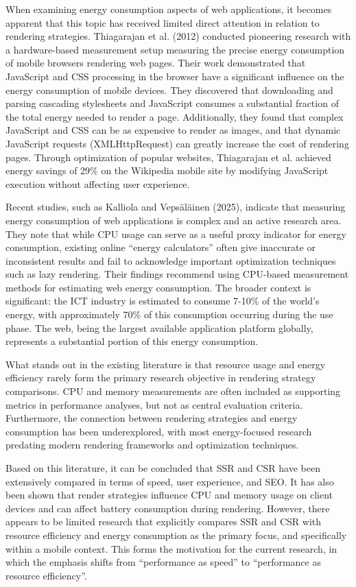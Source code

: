 When examining energy consumption aspects of web applications, it becomes apparent that this topic has received limited direct attention in relation to rendering strategies. Thiagarajan et al. (2012) conducted pioneering research with a hardware-based measurement setup measuring the precise energy consumption of mobile browsers rendering web pages. Their work demonstrated that JavaScript and CSS processing in the browser have a significant influence on the energy consumption of mobile devices. They discovered that downloading and parsing cascading stylesheets and JavaScript consumes a substantial fraction of the total energy needed to render a page. Additionally, they found that complex JavaScript and CSS can be as expensive to render as images, and that dynamic JavaScript requests (XMLHttpRequest) can greatly increase the cost of rendering pages. Through optimization of popular websites, Thiagarajan et al. achieved energy savings of 29\% on the Wikipedia mobile site by modifying JavaScript execution without affecting user experience.

Recent studies, such as Kalliola and Vepsäläinen (2025), indicate that measuring energy consumption of web applications is complex and an active research area. They note that while CPU usage can serve as a useful proxy indicator for energy consumption, existing online ``energy calculators'' often give inaccurate or inconsistent results and fail to acknowledge important optimization techniques such as lazy rendering. Their findings recommend using CPU-based measurement methods for estimating web energy consumption. The broader context is significant: the ICT industry is estimated to consume 7-10\% of the world's energy, with approximately 70\% of this consumption occurring during the use phase. The web, being the largest available application platform globally, represents a substantial portion of this energy consumption.

What stands out in the existing literature is that resource usage and energy efficiency rarely form the primary research objective in rendering strategy comparisons. CPU and memory measurements are often included as supporting metrics in performance analyses, but not as central evaluation criteria. Furthermore, the connection between rendering strategies and energy consumption has been underexplored, with most energy-focused research predating modern rendering frameworks and optimization techniques.

Based on this literature, it can be concluded that SSR and CSR have been extensively compared in terms of speed, user experience, and SEO. It has also been shown that render strategies influence CPU and memory usage on client devices and can affect battery consumption during rendering. However, there appears to be limited research that explicitly compares SSR and CSR with resource efficiency and energy consumption as the primary focus, and specifically within a mobile context. This forms the motivation for the current research, in which the emphasis shifts from ``performance as speed'' to ``performance as resource efficiency''.

